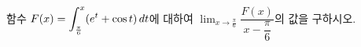 함수 $F(x)=\displaystyle\int_{\frac{\pi}{6}}^{x}(e^t+\cos t)\mkern3mu dt$에 대하여 $\displaystyle\lim_{x\to\frac{\pi}{6}}\dfrac{F(x)}{x-\dfrac{\pi}{6}}$의 값을 구하시오.
